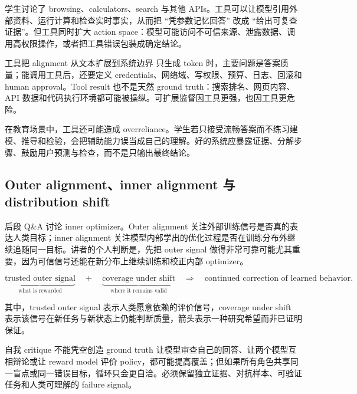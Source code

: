 \documentclass[a4paper]{article}
\begin{document}
学生讨论了 browsing、calculators、search 与其他 APIs。工具可以让模型引用外部资料、运行计算和检查实时事实，从而把 ``凭参数记忆回答'' 改成 ``给出可复查证据''。但工具同时扩大 action space：模型可能访问不可信来源、泄露数据、调用高权限操作，或者把工具错误包装成确定结论。

\begin{knowledgebox}{工具把 alignment 从文本扩展到系统边界}
只生成 token 时，主要问题是答案质量；能调用工具后，还要定义 credentials、网络域、写权限、预算、日志、回滚和 human approval。Tool result 也不是天然 ground truth：搜索排名、网页内容、API 数据和代码执行环境都可能被操纵。可扩展监督因工具更强，也因工具更危险。
\end{knowledgebox}

在教育场景中，工具还可能造成 overreliance。学生若只接受流畅答案而不练习建模、推导和检验，会把辅助能力误当成自己的理解。好的系统应暴露证据、分解步骤、鼓励用户预测与检查，而不是只输出最终结论。

\subsection{Outer alignment、inner alignment 与 distribution shift}

后段 Q\&A 讨论 inner optimizer。Outer alignment 关注外部训练信号是否真的表达人类目标；inner alignment 关注模型内部学出的优化过程是否在训练分布外继续追随同一目标。讲者的个人判断是，先把 outer signal 做得非常可靠可能尤其重要，因为可信信号还能在新分布上继续训练和校正内部 optimizer。

\[
\underbrace{\text{trusted outer signal}}_{\text{what is rewarded}}
\quad+\quad
\underbrace{\text{coverage under shift}}_{\text{where it remains valid}}
\quad\Longrightarrow\quad
\text{continued correction of learned behavior}.
\]

其中，trusted outer signal 表示人类愿意依赖的评价信号，coverage under shift 表示该信号在新任务与新状态上仍能判断质量，箭头表示一种研究希望而非已证明保证。


\begin{warningbox}{自我 critique 不能凭空创造 ground truth}
让模型审查自己的回答、让两个模型互相辩论或让 reward model 评价 policy，都可能提高覆盖；但如果所有角色共享同一盲点或同一错误目标，循环只会更自洽。必须保留独立证据、对抗样本、可验证任务和人类可理解的 failure signal。
\end{warningbox}
\end{document}
